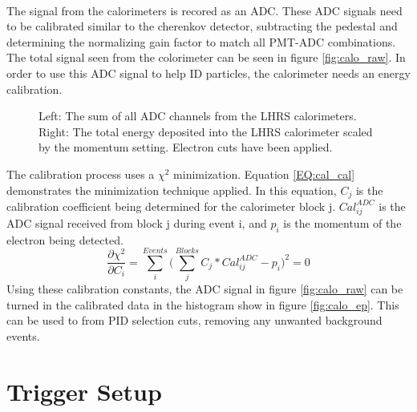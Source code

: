 	\paragraph{} The signal from the calorimeters is recored as an ADC. These ADC signals need to be calibrated similar to the cherenkov detector, subtracting the pedestal and determining the normalizing gain factor to match all PMT-ADC combinations. The total signal seen from the colorimeter can be seen in figure \ref{fig:calo_raw}. In order to use this ADC signal to help ID particles, the calorimeter needs an energy calibration. 
	\begin{figure}[t]
		\centering
		\centering	
		\caption{Left: The sum of all ADC channels from the LHRS calorimeters. Right: The total energy deposited into the LHRS calorimeter scaled by the momentum setting. Electron cuts have been applied.}
	\end{figure}
	The calibration process uses a $\chi^2$ minimization. Equation \ref{EQ:cal_cal} demonstrates the minimization technique applied. In this equation, $C_j$ is the calibration coefficient being determined for the calorimeter block j. $Cal^{ADC}_{ij}$ is the ADC signal received from block j during event i, and $p_i$ is the momentum of the electron being detected. 
	\begin{equation}
		\frac{\partial\chi^2}{\partial C_i} = \sum\limits_{i}^{Events} \bigg( \sum\limits_{j}^{Blocks}C_{j}*Cal^{ADC}_{ij} - p_i  \bigg)^2 = 0 
		\label{EQ:cal_cal}
	\end{equation}
	Using these calibration constants, the ADC signal in figure \ref{fig:calo_raw} can be turned in the calibrated data in the histogram show in figure \ref{fig:calo_ep}. This can be used to from PID selection cuts, removing any unwanted background events.  
	
\section{Trigger Setup}\label{sec:Trig}
